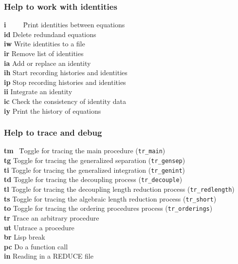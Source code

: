 \documentclass[12pt]{article}
\begin{document}
\subsubsection{Help to work with identities} 
\begin{tabbing}
  {\bf i}\ \ \ \ \ \= Print identities between equations \\
  {\bf id}   \> Delete redundand equations \\
  {\bf iw}   \> Write identities to a file \\
  {\bf ir}   \> Remove list of identities \\
  {\bf ia}   \> Add or replace an identity \\
  {\bf ih}   \> Start recording histories and identities \\
  {\bf ip}   \> Stop recording histories and identities \\
  {\bf ii}   \> Integrate an identity \\
  {\bf ic}   \> Check the consistency of identity data \\
  {\bf iy}   \> Print the history of equations
\end{tabbing}

\subsubsection{Help to trace and debug}
\begin{tabbing}
  {\bf tm}  \ \= Toggle for tracing the main procedure ({\tt tr\_main}) \\
  {\bf tg}    \> Toggle for tracing the generalized separation
                        ({\tt tr\_gensep}) \\
  {\bf ti}    \> Toggle for tracing the generalized integration  
                        ({\tt tr\_genint})  \\
  {\bf td}    \> Toggle for tracing the decoupling process
                        ({\tt tr\_decouple}) \\
  {\bf tl}    \> Toggle for tracing the decoupling length reduction
                        process ({\tt tr\_redlength}) \\
  {\bf ts}    \> Toggle for tracing the algebraic length reduction
                        process ({\tt tr\_short}) \\
  {\bf to}    \> Toggle for tracing the ordering procedures
                        process ({\tt tr\_orderings}) \\
  {\bf tr}    \> Trace an arbitrary procedure \\
  {\bf ut}    \> Untrace a procedure \\
  {\bf br}    \> Lisp break          \\                 
  {\bf pc}    \> Do a function call  \\
  {\bf in}    \> Reading in a REDUCE file
\end{tabbing}
\end{document}
